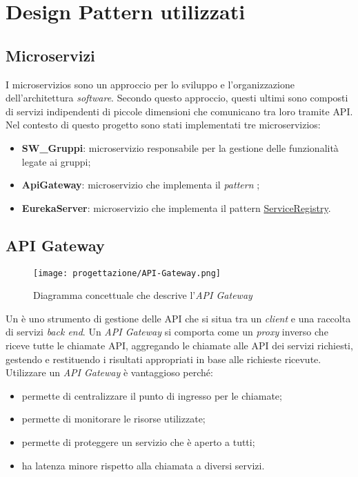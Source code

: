 
\section{Design Pattern utilizzati}
\subsection{Microservizi}
I \glspl{microservizio} sono un approccio per lo sviluppo e l'organizzazione
dell'architettura \textit{software}. Secondo questo approccio, questi ultimi
sono
composti di servizi indipendenti di piccole dimensioni che comunicano tra loro
tramite \gls{API}.\\
Nel contesto di questo progetto sono stati implementati tre
\glspl{microservizio}:
\begin{itemize}
    \item \textbf{SW\_Gruppi}: \gls{microservizio} responsabile per la gestione
          delle funzionalità legate ai gruppi;
    \item \textbf{ApiGateway}: \gls{microservizio} che implementa il
          \textit{pattern} ;
    \item \textbf{EurekaServer}: \gls{microservizio} che implementa il pattern
          \hyperref[sub:ServiceRegistry]{ServiceRegistry}.
          \cite{site-microservizi-aws}
\end{itemize}
\subsection{API Gateway}
\label{sub:ApiGateway}
\begin{figure}[H]
    \centering
    \texttt{[image: progettazione/API-Gateway.png]}
    \caption{Diagramma concettuale che descrive l'\textit{API Gateway}}
\end{figure}
Un  è uno strumento di gestione delle \gls{API} che si situa
tra un \textit{client} e una raccolta di servizi \textit{back end}. Un
\textit{API Gateway} si comporta come un \textit{proxy} inverso che riceve
tutte le chiamate \gls{API}, aggregando le chiamate alle \gls{API} dei servizi
richiesti, gestendo e restituendo i risultati appropriati in base alle
richieste ricevute.\\
Utilizzare un \textit{API Gateway} è vantaggioso perché:
\begin{itemize}
    \item permette di centralizzare il punto di ingresso per le chiamate;
    \item permette di monitorare le risorse utilizzate;
    \item permette di proteggere un servizio che è aperto a tutti;
    \item ha latenza minore rispetto alla chiamata a diversi servizi.
\end{itemize}

